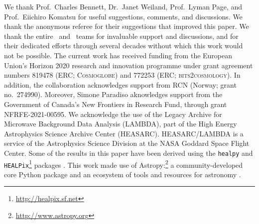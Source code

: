 \begin{acknowledgements}
  We thank Prof.~Charles Bennett, Dr.~Janet Weiland, Prof.~Lyman Page, and
  Prof.~Eiichiro Komatsu for useful suggestions, comments, and discussions. We thank the anonymous referee for their suggestions that improved this paper.
  We thank the entire \Planck\ and \WMAP\ teams for
  invaluable support and discussions, and for their dedicated efforts
  through several decades without which this work would not be
  possible. The current work has received funding from the European
  Union’s Horizon 2020 research and innovation programme under grant
  agreement numbers 819478 (ERC; \textsc{Cosmoglobe}) and 772253 (ERC;
  \textsc{bits2cosmology}).
  In
  addition, the collaboration acknowledges support from
  RCN (Norway; grant no.\ 274990). Moreover, Simone Paradiso aknowledges
  support from the Government of Canada's New Frontiers in Research Fund,
  through grant NFRFE-2021-00595.
  We acknowledge the use of the Legacy Archive for Microwave Background Data
  Analysis (LAMBDA), part of the High Energy Astrophysics Science Archive Center
  (HEASARC). HEASARC/LAMBDA is a service of the Astrophysics Science Division at
  the NASA Goddard Space Flight Center.  
  Some of the results in this paper have been derived using the \texttt{healpy}
  and \texttt{HEALPix}\footnote{\url{http://healpix.sf.net}} packages
  \citep{gorski2005, Zonca2019}.  This work made use of
  Astropy:\footnote{\url{http://www.astropy.org}} a community-developed
  core Python package and an ecosystem of tools and resources for
  astronomy \citep{astropy:2013, astropy:2018, astropy:2022}.
\end{acknowledgements}

